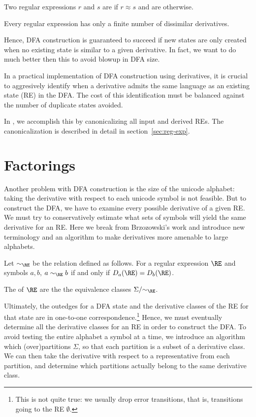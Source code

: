 \begin{definition} Two regular expressions $r$ and $s$ are  if $r \approx s$ and are  otherwise.
\end{definition}

\begin{theorem} Every regular expression has only a finite number of dissimilar derivatives.
\end{theorem}

Hence, DFA construction is guaranteed to succeed if new states are only created when no existing state is similar to a given derivative.  In fact, we want to do much better then this to avoid blowup in DFA size.

\begin{remark}
In a practical implementation of DFA construction using derivatives, it is crucial to aggresively identify when a derivative admits the same language as an existing state (RE) in the DFA.  The cost of this identification must be balanced against the number of duplicate states avoided.
\end{remark}

In \ulex{}, we accomplish this by canonicalizing all input and derived REs.  The canonicalization is described in detail in section~\ref{sec:reg-exp}.

\section{Factorings}\label{sec:factorings}

Another problem with DFA construction is the size of the unicode alphabet: taking the derivative with respect to each unicode symbol is not feasible.  But to construct the DFA, we have to examine every possible derivative of a given RE.  We must try to conservatively estimate what sets of symbols will yield the same derivative for an RE.  Here we break from Brzozowski's work and introduce new terminology and an algorithm to make derivatives more amenable to large alphabets.

Let $\sim_\RE$ be the relation defined as follows.  For a regular expression $\RE$ and symbols $a, b$, $a \sim_\RE b$ if and only if $D_a (\RE) = D_b (\RE)$.

\begin{definition}
The  of $\RE$ are the the equivalence classes $\Sigma/{\sim_\RE}$.
\end{definition}

Ultimately, the outedges for a DFA state and the derivative classes of the RE for that state are in one-to-one correspondence.\footnote{This is not quite true: we usually drop error transitions, that is, transitions going to the RE $\emptyset$.}   Hence, we must eventually determine all the derivative classes for an RE in order to construct the DFA.  To avoid testing the entire alphabet a symbol at a time, we introduce an algorithm which (over)partitions $\Sigma$, so that each partition is a subset of a derivative class.   We can then take the derivative with respect to a representative from each partition, and determine which partitions actually belong to the same derivative class.

